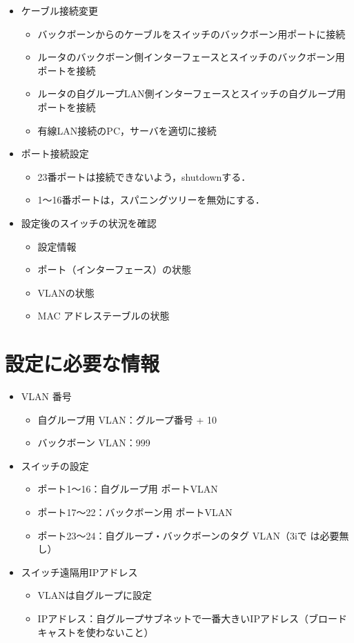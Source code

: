 \begin{itemize}
\item ケーブル接続変更    
    \begin{itemize}
        \item バックボーンからのケーブルをスイッチのバックボーン用ポートに接続
    \item ルータのバックボーン側インターフェースとスイッチのバックボーン用ポートを接続
    \item ルータの自グループLAN側インターフェースとスイッチの自グループ用ポートを接続
    \item 有線LAN接続のPC，サーバを適切に接続
    \end{itemize}
    
\item ポート接続設定
    \begin{itemize}
    \item 23番ポートは接続できないよう，shutdownする．
    \item 1～16番ポートは，スパニングツリーを無効にする．
    \end{itemize}
    
\item 設定後のスイッチの状況を確認
    \begin{itemize}
    \item 設定情報
    \item ポート（インターフェース）の状態
    \item VLANの状態
    \item MAC アドレステーブルの状態
    \end{itemize}
\end{itemize}

\section{設定に必要な情報}

\begin{itemize}
 \item VLAN 番号
       \begin{itemize}
	\item 自グループ用 VLAN：グループ番号 + 10
	\item バックボーン VLAN：999
       \end{itemize}
 \item スイッチの設定
       \begin{itemize}
	\item ポート1〜16：自グループ用 ポートVLAN
	\item ポート17〜22：バックボーン用 ポートVLAN
	\item ポート23〜24：自グループ・バックボーンのタグ VLAN（3iで
	      は必要無し）
       \end{itemize}
 \item スイッチ遠隔用IPアドレス
    \begin{itemize}
        \item VLANは自グループに設定
        \item IPアドレス：自グループサブネットで一番大きいIPアドレス（ブロードキャストを使わないこと）
    \end{itemize}
\end{itemize}

